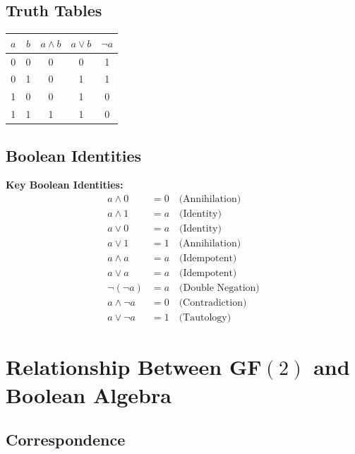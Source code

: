 \documentclass[11pt,a4paper]{article}
\begin{document}
\subsection{Truth Tables}

\begin{center}
\begin{tabular}{|c|c|c|c|c|}
\hline
$a$ & $b$ & $a \wedge b$ & $a \vee b$ & $\neg a$ \\
\hline
0 & 0 & 0 & 0 & 1 \\
0 & 1 & 0 & 1 & 1 \\
1 & 0 & 0 & 1 & 0 \\
1 & 1 & 1 & 1 & 0 \\
\hline
\end{tabular}
\end{center}

\subsection{Boolean Identities}

\begin{theorybox}
\textbf{Key Boolean Identities:}
\begin{align*}
a \wedge 0 &= 0 \quad \text{(Annihilation)} \\
a \wedge 1 &= a \quad \text{(Identity)} \\
a \vee 0 &= a \quad \text{(Identity)} \\
a \vee 1 &= 1 \quad \text{(Annihilation)} \\
a \wedge a &= a \quad \text{(Idempotent)} \\
a \vee a &= a \quad \text{(Idempotent)} \\
\neg(\neg a) &= a \quad \text{(Double Negation)} \\
a \wedge \neg a &= 0 \quad \text{(Contradiction)} \\
a \vee \neg a &= 1 \quad \text{(Tautology)}
\end{align*}
\end{theorybox}

\section{Relationship Between GF$(2)$ and Boolean Algebra}

\subsection{Correspondence}
\end{document}
